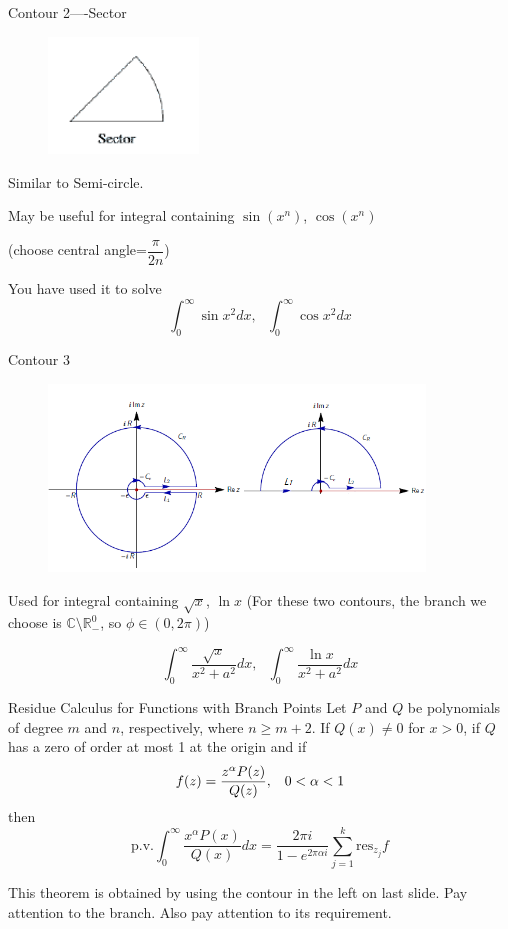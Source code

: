 \documentclass{beamer}
\begin{document}
\begin{frame}
\begin{block}{Contour 2----Sector}
\begin{figure}[h]
    \centering
    \includegraphics[width=4cm]{sector.png}
\end{figure}
Similar to Semi-circle.

May be useful for integral containing $\sin(x^n)$, $\cos(x^n)$ 

(choose central angle=$\dfrac{\pi}{2n}$) 

You have used it to solve 
$$\int_0^{\infty}\sin x^2dx,\,\,\,\,\int_{0}^{\infty}\cos x^2dx$$
\end{block}
\end{frame}

\begin{frame}
\begin{block}{Contour 3}
\begin{figure}[h]
    \centering
    \includegraphics[width=10cm]{branch.png}
\end{figure}

Used for integral containing $\sqrt{x}$, $\ln x$ (For these two contours, the branch we choose is $\mathbb{C}\setminus\mathbb{R}^0_-$, so $\phi\in(0,2\pi)$)

$$\int_0^{\infty}\dfrac{\sqrt{x}}{x^2+a^2}dx,\,\,\,\,\int_{0}^{\infty}\dfrac{\ln x}{x^2+a^2}dx$$
\end{block}
\end{frame}


\begin{frame}
\begin{block}{Residue Calculus for Functions with Branch Points}
Let $P$ and $Q$ be polynomials of degree $m$ and $n$, respectively, where $n\geqslant m+2$. If $Q(x)\neq0$ for $x>0$, if $Q$ has a zero of order at most 1 at the origin and if
$$f(z)=\dfrac{z^{\alpha}P(z)}{Q(z)},\hspace{3mm}0<\alpha<1$$
then
$$\text{p.v.}\int_0^{\infty}\dfrac{x^{\alpha}P(x)}{Q(x)}dx=\dfrac{2\pi i}{1-e^{2\pi \alpha i}}\sum\limits_{j=1}^k\text{res}_{z_j}f$$
\end{block}
This theorem is obtained by using the contour in the left on last slide. Pay attention to the branch. Also pay attention to its requirement. 
\end{frame}
\end{document}
